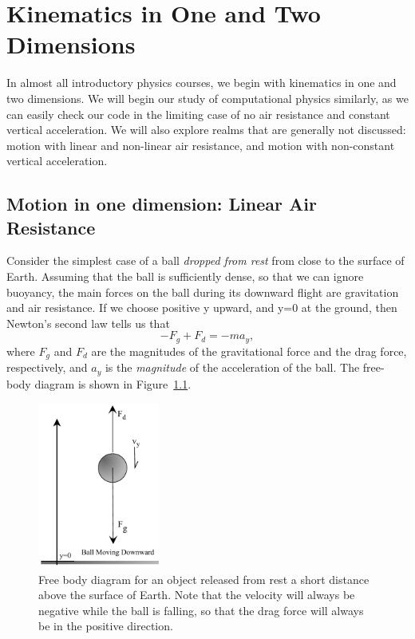 %
\chapter{Kinematics in One and Two Dimensions}
\label{ch-kinematics} %
In almost all introductory physics courses, we begin with kinematics in one and two dimensions. We will begin our study of computational physics similarly, as we can easily check our code in the limiting case of no air resistance and constant vertical acceleration. We will also explore realms that are generally not discussed: motion with linear and non-linear air resistance, and motion with non-constant vertical acceleration. 
\section{Motion in one dimension: Linear Air Resistance}
\label{sec-1d}
Consider the simplest case of a ball \textit{dropped from rest} from close to the surface of Earth. Assuming that the ball is sufficiently dense, so that we can ignore buoyancy, the main forces on the ball during its downward flight are gravitation and air resistance. If we choose positive y upward, and y=0 at the ground, then Newton's second law tells us that 
$$ - F_g + F_d = - m a_y ,$$
where $F_g$ and $F_d$ are the magnitudes of the gravitational force and the drag force, respectively, and $a_y$ is the \textit{magnitude} of the acceleration of the ball. The free-body diagram is shown in  Figure~\ref{fig-FreeFall}. 
\begin{figure}
\centering
\sidecaption
\includegraphics[width=4cm]{Figures/Kinematics/FreeFallDown}
\caption{Free body diagram for an object released from rest a short distance above the surface of Earth.
Note that the velocity will always be negative while the ball is falling, so that the drag force will always 
be in the positive direction.}
\label{fig-FreeFall}       %
\end{figure}
